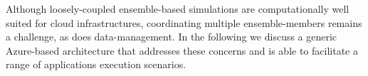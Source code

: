 \documentclass[graybox]{svmult}
\begin{document}
Although loosely-coupled ensemble-based simulations are
computationally well suited for cloud infrastructures, coordinating
multiple ensemble-members remains a challenge, as does
data-management.
In the following we discuss a generic Azure-based architecture that
addresses these concerns and is able to facilitate a range of
applications execution scenarios.
\end{document}
